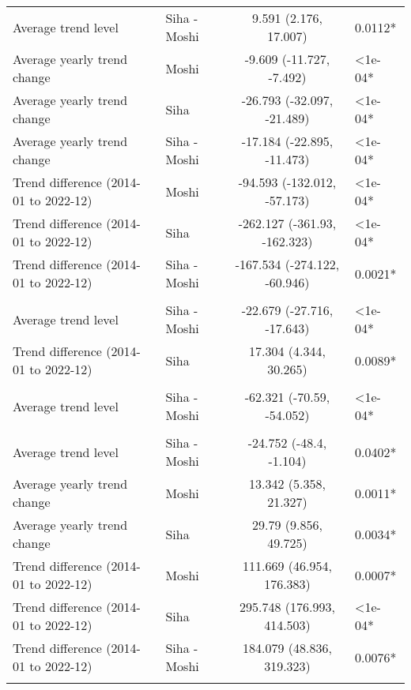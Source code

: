 \begin{longtable}{l|lcl}
\midrule\addlinespace[2.5pt]
\multicolumn{4}{l}{Malaria} \\ 
\midrule\addlinespace[2.5pt]
Average trend level & Siha - Moshi & 9.591 (2.176, 17.007) & 0.0112* \\ 
Average yearly trend change & Moshi & -9.609 (-11.727, -7.492) & <1e-04* \\ 
Average yearly trend change & Siha & -26.793 (-32.097, -21.489) & <1e-04* \\ 
Average yearly trend change & Siha - Moshi & -17.184 (-22.895, -11.473) & <1e-04* \\ 
Trend difference (2014-01 to 2022-12) & Moshi & -94.593 (-132.012, -57.173) & <1e-04* \\ 
Trend difference (2014-01 to 2022-12) & Siha & -262.127 (-361.93, -162.323) & <1e-04* \\ 
Trend difference (2014-01 to 2022-12) & Siha - Moshi & -167.534 (-274.122, -60.946) & 0.0021* \\ 
\midrule\addlinespace[2.5pt]
\multicolumn{4}{l}{Neuroses} \\ 
\midrule\addlinespace[2.5pt]
Average trend level & Siha - Moshi & -22.679 (-27.716, -17.643) & <1e-04* \\ 
Trend difference (2014-01 to 2022-12) & Siha & 17.304 (4.344, 30.265) & 0.0089* \\ 
\midrule\addlinespace[2.5pt]
\multicolumn{4}{l}{Other Cardiovascular Diseases} \\ 
\midrule\addlinespace[2.5pt]
Average trend level & Siha - Moshi & -62.321 (-70.59, -54.052) & <1e-04* \\ 
\midrule\addlinespace[2.5pt]
\multicolumn{4}{l}{Peptic Ulcers} \\ 
\midrule\addlinespace[2.5pt]
Average trend level & Siha - Moshi & -24.752 (-48.4, -1.104) & 0.0402* \\ 
Average yearly trend change & Moshi & 13.342 (5.358, 21.327) & 0.0011* \\ 
Average yearly trend change & Siha & 29.79 (9.856, 49.725) & 0.0034* \\ 
Trend difference (2014-01 to 2022-12) & Moshi & 111.669 (46.954, 176.383) & 0.0007* \\ 
Trend difference (2014-01 to 2022-12) & Siha & 295.748 (176.993, 414.503) & <1e-04* \\ 
Trend difference (2014-01 to 2022-12) & Siha - Moshi & 184.079 (48.836, 319.323) & 0.0076* \\ 
\midrule\addlinespace[2.5pt]
\multicolumn{4}{l}{Pneumonia, Severe} \\ 

\end{longtable}
